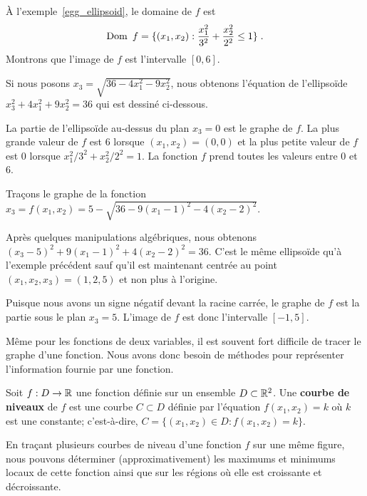 {\begin{egg}
À l'exemple~\ref{egg_ellipsoid}, le domaine de $f$ est
\[
\DO f = \{ (x_1,x_2) : \frac{x_1^2}{3^2} + \frac{x_2^2}{2^2} \leq 1 \} \; .
\]
Montrons que l'image de $f$ est l'intervalle $[0,6]$.

Si nous posons $x_3 = \sqrt{36-4x_1^2-9x_2^2}$, nous obtenons l'équation de
l'ellipsoïde $x_3^2 + 4x_1^2 + 9x_2^2 = 36$ qui est dessiné ci-dessous.

La partie de l'ellipsoïde au-dessus du plan $x_3=0$ est le graphe de
$f$.  La plus grande valeur de $f$ est $6$ lorsque $(x_1,x_2)=(0,0)$ et la
plus petite valeur de $f$ est $0$ lorsque $x_1^2/3^2 + x_2^2/2^2 = 1$.  La
fonction $f$ prend toutes les valeurs entre $0$ et $6$.
\end{egg}

\begin{egg}
Traçons le graphe de la fonction
$x_3 = f(x_1,x_2) = 5 - \sqrt{36 - 9(x_1-1)^2 - 4(x_2-2)^2}$.

Après quelques manipulations algébriques, nous obtenons
$(x_3 - 5)^2 + 9(x_1-1)^2 + 4(x_2-2)^2 = 36$.  C'est le même
ellipsoïde qu'à l'exemple précédent sauf qu'il est maintenant centrée
au point $(x_1,x_2,x_3) = (1,2,5)$ et non plus à l'origine.

Puisque nous avons un signe négatif devant la racine carrée, le graphe de
$f$ est la partie sous le plan $x_3 = 5$.   L'image de $f$ est donc
l'intervalle $[-1,5]$.
\end{egg}

Même pour les fonctions de deux variables, il est souvent fort
difficile de tracer le graphe d'une fonction.  Nous avons donc besoin de
méthodes pour représenter l'information fournie par une fonction.

\begin{focus}{\dfn} 
Soit $f:D\rightarrow \mathbb{R}$ une fonction définie sur un ensemble
$D\subset \mathbb{R}^2$.  Une {\bfseries courbe de niveaux} de $f$ est une
courbe $C \subset D$ définie par l'équation $f(x_1,x_2) = k$ où $k$
est une constante; c'est-à-dire,
$\displaystyle C = \{ (x_1,x_2) \in D : f(x_1,x_2) = k \}$.
\end{focus}

En traçant plusieurs courbes de niveau d'une fonction $f$ sur une
même figure, nous pouvons déterminer (approximativement) les maximums
et minimums locaux de cette fonction ainsi que sur les régions où elle
est croissante et décroissante.

}
